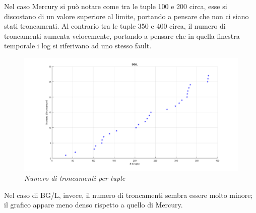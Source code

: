 Nel caso Mercury si può notare come tra le tuple 100 e 200 circa, esse si discostano di un valore superiore al limite, portando a pensare che non ci siano stati troncamenti. Al contrario tra le tuple 350 e 400 circa, il numero di troncamenti aumenta velocemente, portando a pensare che in quella finestra temporale i log si riferivano ad uno stesso fault.
\begin{figure}[H]
	\centering
	\includegraphics[width=\textwidth]{img/hw6/troncamento_bgl.png}
	\caption{\textit{Numero di troncamenti per tuple}}
\end{figure}
Nel caso di BG/L, invece, il numero di troncamenti sembra essere molto minore; il grafico appare meno denso rispetto a quello di Mercury. 

